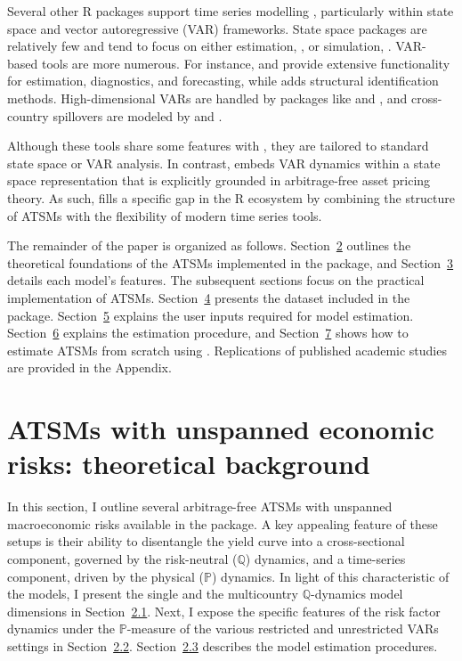 Several other R packages support time series modelling \citep{HyndmanKillick2025}, particularly within state space and vector autoregressive (VAR) frameworks. State space packages are relatively few and tend to focus on either estimation,  \citep{statespacer2023}, or simulation,  \citep{simStateSpace2025}. VAR-based tools are more numerous. For instance,  \citep{vars2024} and  \citep{MTS2022} provide extensive functionality for estimation, diagnostics, and forecasting, while  \citep{svars2023} adds structural identification methods. High-dimensional VARs are handled by packages like  \citep{bigtime2023} and  \citep{BigVAR2025}, and cross-country spillovers are modeled by  \citep{Spillover2024} and  \citep{BGVAR2024}.

Although these tools share some features with , they are tailored to standard state space or VAR analysis. In contrast,  embeds VAR dynamics within a state space representation that is explicitly grounded in arbitrage-free asset pricing theory. As such,  fills a specific gap in the R ecosystem by combining the structure of ATSMs with the flexibility of modern time series tools.

The remainder of the paper is organized as follows. Section~\hyperref[S:ATSMTheory]{2} outlines the theoretical foundations of the ATSMs implemented in the  package, and Section~\hyperref[S:ATSMoptions]{3} details each model's features. The subsequent sections focus on the practical implementation of ATSMs. Section~\hyperref[S:SectionData]{4} presents the dataset included in the package. Section~\hyperref[S:SectionInputs]{5} explains the user inputs required for model estimation. Section~\hyperref[S:SectionEstimation]{6} explains the estimation procedure, and Section~\hyperref[S:SectionImplementation]{7} shows how to estimate ATSMs from scratch using . Replications of published academic studies are provided in the Appendix.

\section{ATSMs with unspanned economic risks: theoretical background}\label{S:ATSMTheory}

In this section, I outline several arbitrage-free ATSMs with unspanned macroeconomic risks available in the  package. A key appealing feature of these setups is their ability to disentangle the yield curve into a cross-sectional component, governed by the risk-neutral (\(\mathbb{Q}\)) dynamics, and a time-series component, driven by the physical (\(\mathbb{P}\)) dynamics. In light of this characteristic of the models, I present the single and the multicountry \(\mathbb{Q}\)-dynamics model dimensions in Section~\hyperref[S:Qdyn]{2.1}. Next, I expose the specific features of the risk factor dynamics under the \(\mathbb{P}\)-measure of the various restricted and unrestricted VARs settings in Section~\hyperref[S:Pdyn]{2.2}. Section~\hyperref[S:ATSMestimation]{2.3} describes the model estimation procedures.


